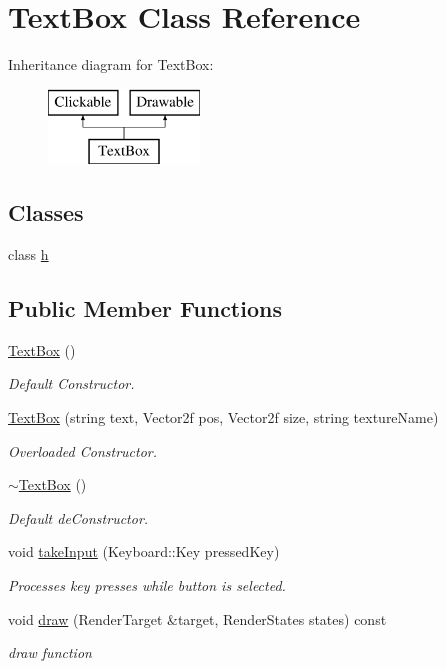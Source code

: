 \hypertarget{class_text_box}{}\section{Text\+Box Class Reference}
\label{class_text_box}
Inheritance diagram for Text\+Box\+:\begin{figure}[H]
\begin{center}
\leavevmode
\includegraphics[height=2.000000cm]{class_text_box}
\end{center}
\end{figure}
\subsection*{Classes}
\begin{DoxyCompactItemize}
\item 
class \hyperlink{class_text_box_1_1h}{h}
\end{DoxyCompactItemize}
\subsection*{Public Member Functions}
\begin{DoxyCompactItemize}
\item 
\hyperlink{class_text_box_a25b67e5ff6788c60b8aef3f3540879d0}{Text\+Box} ()
\begin{DoxyCompactList}\small\item\em Default Constructor. \end{DoxyCompactList}\item 
\hyperlink{class_text_box_a9df04c5eb70d4d6b75907c56ecce6d8e}{Text\+Box} (string text, Vector2f pos, Vector2f size, string texture\+Name)
\begin{DoxyCompactList}\small\item\em Overloaded Constructor. \end{DoxyCompactList}\item 
\hyperlink{class_text_box_ac3cc88a3ac171658ebaf44b01f4adf80}{$\sim$\+Text\+Box} ()
\begin{DoxyCompactList}\small\item\em Default de\+Constructor. \end{DoxyCompactList}\item 
void \hyperlink{class_text_box_a9139c31dc807fa0c478215086f3fc7f1}{take\+Input} (Keyboard\+::\+Key pressed\+Key)
\begin{DoxyCompactList}\small\item\em Processes key presses while button is selected. \end{DoxyCompactList}\item 
void \hyperlink{class_text_box_a94f8b1fa218dabaaf892388cbf8df1fa}{draw} (Render\+Target \&target, Render\+States states) const
\begin{DoxyCompactList}\small\item\em draw function \end{DoxyCompactList}\end{DoxyCompactItemize}
